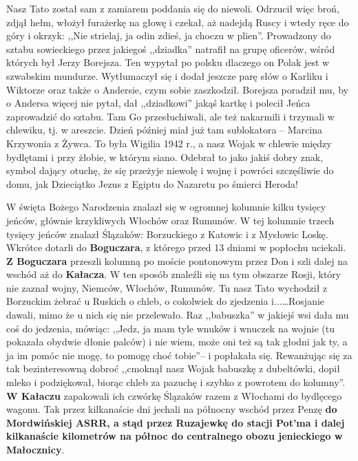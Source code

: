 Nasz Tato został sam z zamiarem poddania się do niewoli. Odrzucił więc broń, zdjął hełm, włożył furażerkę na głowę i czekał, aż nadejdą Ruscy i wtedy ręce do góry i okrzyk: ,,Nie strielaj, ja odin zdieś, ja choczu w plien''. Prowadzony do sztabu sowieckiego przez jakiegoś ,,dziadka'' natrafił na grupę oficerów, wśród których był Jerzy Borejsza. Ten wypytał po polsku dlaczego on Polak jest w szwabskim mundurze. Wytłumaczył się i dodał jeszcze parę słów o Karliku i Wiktorze oraz także o Andersie, czym sobie zaszkodził. Borejsza poradził mu, by o Andersa więcej nie pytał, dał ,,dziadkowi'' jakąś kartkę i polecił Jeńca zaprowadzić do sztabu. Tam Go przesłuchiwali, ale też nakarmili i trzymali w chlewiku, tj. w areszcie. Dzień później miał już tam sublokatora -- Marcina Krzywonia z Żywca. To była Wigilia 1942 r., a nasz Wojak w chlewie między bydlętami i przy żłobie, w którym siano. Odebrał to jako jakiś dobry znak, symbol dający otuchę, że się przeżyje niewolę i wojnę i powróci szczęśliwie do domu, jak Dzieciątko Jezus z Egiptu do Nazaretu po śmierci Heroda!

W święta Bożego Narodzenia znalazł się w ogromnej kolumnie kilku tysięcy jeńców, głównie krzykliwych Włochów oraz Rumunów. W tej kolumnie trzech tysięcy jeńców znalazł Ślązaków: Borzuckiego z Katowic i z Mysłowic Loskę. Wkrótce dotarli do \textbf{Boguczara}, z którego przed 13 dniami w popłochu uciekali. \textbf{Z Boguczara} przeszli kolumną po moście pontonowym przez Don i szli dalej na wschód aż do \textbf{Kałacza}. W ten sposób  znaleźli się na tym obszarze Rosji, który nie zaznał wojny, Niemców, Włochów, Rumunów. Tu nasz Tato wychodził z Borzuckim żebrać u Ruskich o chleb, o cokolwiek do zjedzenia i...\ldots Rosjanie dawali, mimo że u nich się nie przelewało. Raz ,,babuszka'' w jakiejś wsi dała mu coś do jedzenia, mówiąc: ,,Jedz, ja mam tyle wnuków i wnuczek na wojnie (tu pokazała obydwie dłonie palców) i nie wiem, może oni też są tak głodni jak ty, a ja im pomóc nie mogę, to pomogę choć tobie''-- i popłakała się. Rewanżując się za tak bezinteresowną dobroć ,,cmoknął nasz Wojak babuszkę z dubeltówki, dopił mleko i podziękował, biorąc chleb za pazuchę i szybko z powrotem do kolumny''. \textbf{W Kałaczu} zapakowali ich czwórkę Ślązaków razem z Włochami do bydlęcego wagonu. Tak przez kilkanaście dni jechali na północny wschód przez Penzę \textbf{do Mordwińskiej ASRR, a stąd przez Ruzajewkę do stacji Pot’ma i dalej kilkanaście kilometrów na północ do centralnego obozu jenieckiego w Małocznicy}.

